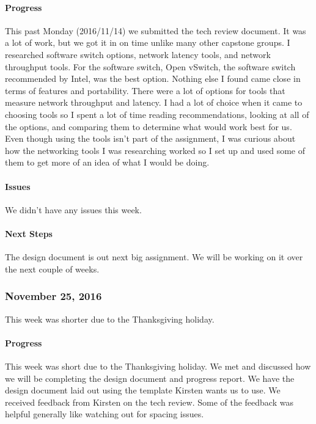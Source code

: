 \documentclass[10pt,onecolumn,journal,draftclsnofoot]{IEEEtran}
\begin{document}
\paragraph{Progress} 

This past Monday (2016/11/14) we submitted the tech review document. It
was a lot of work, but we got it in on time unlike many other capstone
groups. I researched software switch options, network latency tools, and
network throughput tools. For the software switch, Open vSwitch, the
software switch recommended by Intel, was the best option. Nothing else
I found came close in terms of features and portability. There were a
lot of options for tools that measure network throughput and latency. I
had a lot of choice when it came to choosing tools so I spent a lot of
time reading recommendations, looking at all of the options, and
comparing them to determine what would work best for us. Even though
using the tools isn't part of the assignment, I was curious about how
the networking tools I was researching worked so I set up and used some
of them to get more of an idea of what I would be doing.

\paragraph{Issues} 

We didn't have any issues this week.

\paragraph{Next Steps} 

The design document is out next big assignment. We will be working on it
over the next couple of weeks.

\subsubsection{November 25, 2016} 

This week was shorter due to the Thanksgiving holiday.

\paragraph{Progress} 

This week was short due to the Thanksgiving holiday. We met and
discussed how we will be completing the design document and progress
report. We have the design document laid out using the template Kirsten
wants us to use. We received feedback from Kirsten on the tech review.
Some of the feedback was helpful generally like watching out for spacing
issues.
\end{document}
